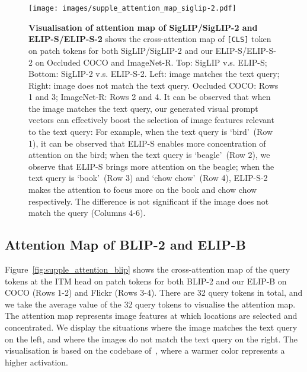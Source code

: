 \begin{figure*}[h]
	\centering
\texttt{[image: images/supple\_attention\_map\_siglip-2.pdf]}
	\caption{
\textbf{Visualisation of attention map of SigLIP/SigLIP-2 and ELIP-S/ELIP-S-2} shows the cross-attention map of \texttt{[CLS]} token on patch tokens for both SigLIP/SigLIP-2 and our ELIP-S/ELIP-S-2 on Occluded COCO and ImageNet-R. Top: SigLIP v.s. ELIP-S; Bottom: SigLIP-2 v.s. ELIP-S-2. Left: image matches the text query; Right: image does not match the text query. Occluded COCO: Rows 1 and 3; ImageNet-R: Rows 2 and 4.
It can be observed that when the image matches the text query, our generated visual prompt vectors can effectively boost the selection of image features relevant to the text query: 
For example, when the text query is `bird'~(Row 1), it can be observed that ELIP-S enables more concentration of attention on the bird; when the text query is `beagle'~(Row 2), we observe that ELIP-S brings more attention on the beagle; when the text query is `book'~(Row 3) and `chow chow'~(Row 4), ELIP-S-2 makes the attention to focus more on the book and chow chow respectively.
The difference is not significant if the image does not match the query (Columns 4-6). 
	} 
	\label{fig:supple_attention_siglip-2}
	\end{figure*}
    


\clearpage
\subsection{Attention Map of BLIP-2 and ELIP-B}



Figure~\ref{fig:supple_attention_blip} shows the cross-attention map of the query tokens at the ITM head on patch tokens for both BLIP-2 and our ELIP-B on COCO (Rows 1-2) and Flickr (Rows 3-4). There are 32 query tokens in total, and we take the average value of the 32 query tokens to visualise the attention map. The attention map represents image features at which locations are selected and concentrated. We display the situations where the image matches the text query on the left, and where the images do not match the text query on the right. The visualisation is based on the codebase of~\cite{selvaraju2017grad}, where a warmer color represents a higher activation.



